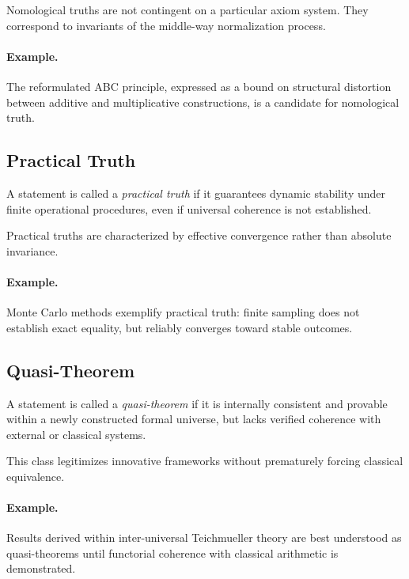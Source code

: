 \documentclass[11pt]{article}
\begin{document}
Nomological truths are not contingent on a particular axiom system.
They correspond to invariants of the middle-way normalization process.

\paragraph{Example.}
The reformulated ABC principle, expressed as a bound on structural
distortion between additive and multiplicative constructions, is a
candidate for nomological truth.

\subsection{Practical Truth}

\begin{definition}
A statement is called a \emph{practical truth} if it guarantees dynamic
stability under finite operational procedures, even if universal
coherence is not established.
\end{definition}

Practical truths are characterized by effective convergence rather
than absolute invariance.

\paragraph{Example.}
Monte Carlo methods exemplify practical truth: finite sampling does not
establish exact equality, but reliably converges toward stable outcomes.

\subsection{Quasi-Theorem}

\begin{definition}
A statement is called a \emph{quasi-theorem} if it is internally
consistent and provable within a newly constructed formal universe,
but lacks verified coherence with external or classical systems.
\end{definition}

This class legitimizes innovative frameworks without prematurely
forcing classical equivalence.

\paragraph{Example.}
Results derived within inter-universal Teichmueller theory are best
understood as quasi-theorems until functorial coherence with classical
arithmetic is demonstrated.
\end{document}
